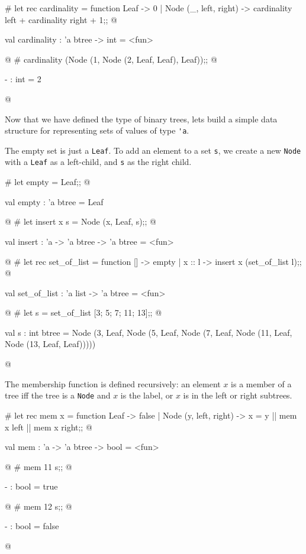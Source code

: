 \begin{ocaml}
# let rec cardinality = function
     Leaf -> 0
   | Node (_, left, right) ->
        cardinality left + cardinality right + 1;;
@
\begin{topoutput}
val cardinality : 'a btree -> int = <fun>
\end{topoutput}
@
# cardinality (Node (1, Node (2, Leaf, Leaf), Leaf));;
@
\begin{topoutput}
- : int = 2
\end{topoutput}
@
\end{ocaml}


Now that we have defined the type of binary trees, lets build a simple
data structure for representing sets of values of type \hbox{\lstinline/'a/}.

The empty set is just a \hbox{\lstinline/Leaf/}.  To add an element to a set \hbox{\lstinline/s/}, we
create a new \hbox{\lstinline/Node/} with a \hbox{\lstinline/Leaf/} as a left-child, and
\hbox{\lstinline/s/} as the right child.

\begin{ocaml}
# let empty = Leaf;;
@
\begin{topoutput}
val empty : 'a btree = Leaf
\end{topoutput}
@
# let insert x s = Node (x, Leaf, s);;
@
\begin{topoutput}
val insert : 'a -> 'a btree -> 'a btree = <fun>
\end{topoutput}
@
# let rec set_of_list = function
     [] -> empty
   | x :: l -> insert x (set_of_list l);;
@
\begin{topoutput}
val set_of_list : 'a list -> 'a btree = <fun>
\end{topoutput}
@
# let s = set_of_list [3; 5; 7; 11; 13];;
@
\begin{topoutput}
val s : int btree =
  Node
   (3, Leaf,
    Node (5, Leaf,
      Node (7, Leaf,
        Node (11, Leaf, Node (13, Leaf, Leaf)))))
\end{topoutput}
@
\end{ocaml}
%
The membership function is defined recursively: an
element $x$ is a member of a tree iff the tree is a \hbox{\lstinline/Node/} and $x$
is the label, or $x$ is in the left or right subtrees.

\begin{ocaml}
# let rec mem x = function
     Leaf -> false
   | Node (y, left, right) ->
       x = y || mem x left || mem x right;;
@
\begin{topoutput}
val mem : 'a -> 'a btree -> bool = <fun>
\end{topoutput}
@
# mem 11 s;;
@
\begin{topoutput}
- : bool = true
\end{topoutput}
@
# mem 12 s;;
@
\begin{topoutput}
- : bool = false
\end{topoutput}
@
\end{ocaml}

